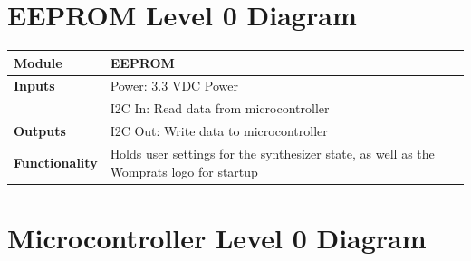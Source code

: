 \documentclass{article}
\begin{document}
\section{EEPROM Level 0 Diagram}

\begin{tabular}{|p{1in}|p{5in}|}
\hline
\textbf{Module} & EEPROM \\
\hline
\textbf{Inputs}& Power: 3.3 VDC Power\\
	     & I2C In: Read data from microcontroller \\
\hline
\textbf{Outputs}& I2C Out: Write data to microcontroller \\ 
\hline
\textbf{Functionality}& Holds user settings for the synthesizer state, as well as the Womprats logo for startup\\
\hline
\end{tabular}

\section{Microcontroller Level 0 Diagram}
\end{document}
